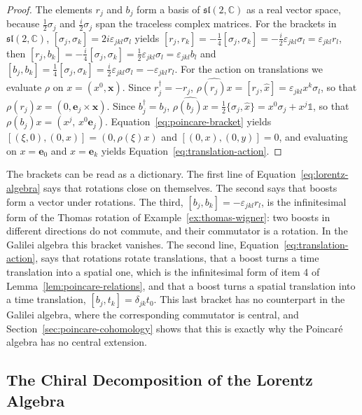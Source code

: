 \begin{proof}
		The elements $r_j$ and $b_j$ form a basis of $\mathfrak{sl}(2,\mathbb{C})$ as a real vector space, because $\tfrac12\sigma_j$ and $\tfrac i2\sigma_j$ span the traceless complex matrices. For the brackets in $\mathfrak{sl}(2,\mathbb{C})$, $[\sigma_j,\sigma_k]=2i\varepsilon_{jkl}\sigma_l$ yields $[r_j,r_k]=-\tfrac14[\sigma_j,\sigma_k]=-\tfrac i2\varepsilon_{jkl}\sigma_l=\varepsilon_{jkl}r_l$, then $[r_j,b_k]=-\tfrac i4[\sigma_j,\sigma_k]=\tfrac12\varepsilon_{jkl}\sigma_l=\varepsilon_{jkl}b_l$ and $[b_j,b_k]=\tfrac14[\sigma_j,\sigma_k]=\tfrac i2\varepsilon_{jkl}\sigma_l=-\varepsilon_{jkl}r_l$. For the action on translations we evaluate $\rho$ on $x=(x^0,\mathbf{x})$. Since $r_j^\dagger=-r_j$, $\widehat{\rho(r_j)x}=[r_j,\hat{x}]=\varepsilon_{jkl}x^k\sigma_l$, so that $\rho(r_j)x=(0,\mathbf{e}_j\times\mathbf{x})$. Since $b_j^\dagger=b_j$, $\widehat{\rho(b_j)x}=\tfrac12\{\sigma_j,\hat{x}\}=x^0\sigma_j+x^j\mathbb{1}$, so that $\rho(b_j)x=(x^j,\,x^0\mathbf{e}_j)$. Equation~\eqref{eq:poincare-bracket} yields $[(\xi,0),(0,x)]=(0,\rho(\xi)x)$ and $[(0,x),(0,y)]=0$, and evaluating on $x=\mathbf{e}_0$ and $x=\mathbf{e}_k$ yields Equation~\eqref{eq:translation-action}.
	\end{proof}
	
	The brackets can be read as a dictionary. The first line of Equation~\eqref{eq:lorentz-algebra} says that rotations close on themselves. The second says that boosts form a vector under rotations. The third, $[b_j,b_k]=-\varepsilon_{jkl}r_l$, is the infinitesimal form of the Thomas rotation of Example~\ref{ex:thomas-wigner}: two boosts in different directions do not commute, and their commutator is a rotation. In the Galilei algebra this bracket vanishes. The second line, Equation~\eqref{eq:translation-action}, says that rotations rotate translations, that a boost turns a time translation into a spatial one, which is the infinitesimal form of item 4 of Lemma~\ref{lem:poincare-relations}, and that a boost turns a spatial translation into a time translation, $[b_j,t_k]=\delta_{jk}t_0$. This last bracket has no counterpart in the Galilei algebra, where the corresponding commutator is central, and Section~\ref{sec:poincare-cohomology} shows that this is exactly why the Poincar\'e algebra has no central extension.
	
	\subsection*{The Chiral Decomposition of the Lorentz Algebra}
	
